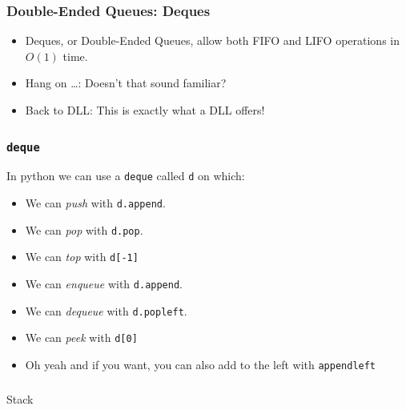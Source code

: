 \begin{frame}
	\frametitle{Double-Ended Queues: Deques}
		\begin{itemize}
		\item Deques, or Double-Ended Queues, allow both FIFO and LIFO operations in $O(1)$ time.
		\item Hang on \ldots: 	Doesn't that sound familiar?	
		\item Back to DLL: 	This is exactly what a DLL offers!
		\end{itemize}
\end{frame}

\begin{frame}
	\frametitle{\texttt{deque}}
	
	In python we can use a \texttt{deque} called \texttt{d} on which:
	\begin{itemize}
		\item We can \textit{push} with \texttt{d.append}.
		\item We can \textit{pop} with \texttt{d.pop}.
		\item We can \textit{top} with \texttt{d[-1]}
			
		\item We can \textit{enqueue} with \texttt{d.append}.
		\item We can \textit{dequeue} with \texttt{d.popleft}.
		\item We can \textit{peek} with \texttt{d[0]}
			
		\item Oh yeah and if you want, you can also add to the left with \texttt{appendleft}
	\end{itemize}
\end{frame}


\begin{frame}[fragile]\frametitle{}
\begin{center}
{\Large Stack}
\end{center}

\end{frame}


